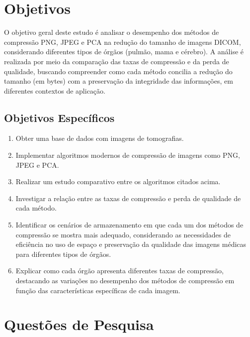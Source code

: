 \section{Objetivos}
\label{intro:objet}

O objetivo geral deste estudo é analisar o desempenho dos métodos de compressão \acrshort{PNG}, \acrshort{JPEG} e \acrshort{PCA} na redução do tamanho de imagens \acrshort{DICOM}, considerando diferentes tipos de órgãos (pulmão, mama e cérebro). A análise é realizada por meio da comparação das taxas de compressão e da perda de qualidade, buscando compreender como cada método concilia a redução do tamanho (em bytes) com a preservação da integridade das informações, em diferentes contextos de aplicação.

\subsection{Objetivos Específicos}
\begin{enumerate}
    \item Obter uma base de dados com imagens de tomografias.
    \item Implementar algoritmos modernos de compressão de imagens como \acrfull{PNG}, \acrfull{JPEG} e \acrfull{PCA}.
    \item Realizar um estudo comparativo entre os algoritmos citados acima.
    \item Investigar a relação entre as taxas de compressão e perda de qualidade de cada método.
    \item Identificar os cenários de armazenamento em que cada um dos métodos de compressão se mostra mais adequado, considerando as necessidades de eficiência no uso de espaço e preservação da qualidade das imagens médicas para diferentes tipos de órgãos.
    \item Explicar como cada órgão apresenta diferentes taxas de compressão, destacando as variações no desempenho dos métodos de compressão em função das características específicas de cada imagem.
\end{enumerate}

\section{Questões de Pesquisa}
\label{intro:questp}


